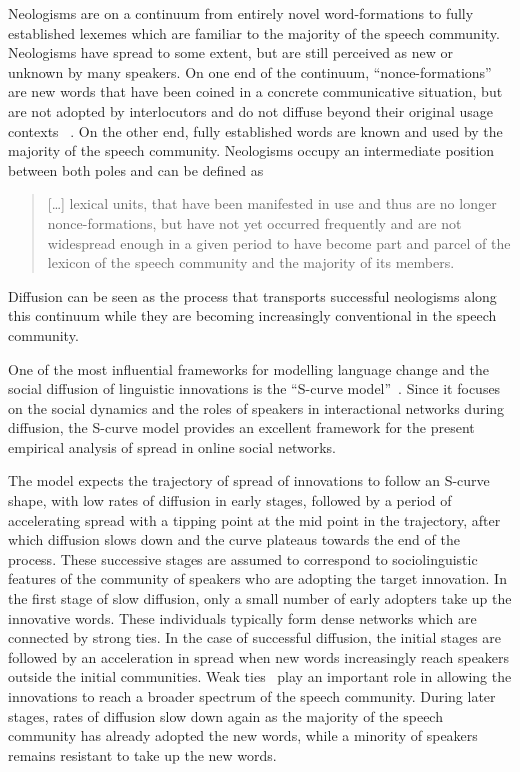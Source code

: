 \documentclass[
  a4paper,
  abstract=on,
  captions=tableabove
  ]{scrartcl}
\begin{document}
    Neologisms are on a continuum from entirely novel word-formations to fully established lexemes which are familiar to the majority of the speech community. Neologisms have spread to some extent, but are still perceived as new or unknown by many speakers. On one end of the continuum, \enquote{nonce-formations} are new words that have been coined in a concrete communicative situation, but are not adopted by interlocutors and do not diffuse beyond their original usage contexts~ \parencite{Hohenhaus1996AdhocWortbildungTerminologie}. On the other end, fully established words are known and used by the majority of the speech community. Neologisms occupy an intermediate position between both poles and can be defined as

    \blockquote[{\cite[31]{Kerremans2015WebNew}}]{
      [\dots] lexical units, that have been manifested in use and thus are no longer nonce-formations, but have not yet occurred frequently and are not widespread enough in a given period to have become part and parcel of the lexicon of the speech community and the majority of its members.
      }

    Diffusion can be seen as the process that transports successful neologisms along this continuum while they are becoming increasingly conventional in the speech community.
  
    One of the most influential frameworks for modelling language change and the social diffusion of linguistic innovations is the \enquote{S-curve model}~\parencite{Milroy1992LinguisticVariation, Nevalainen2015DescriptiveAdequacy, Labov2007TransmissionDiffusion}. Since it focuses on the social dynamics and the roles of speakers in interactional networks during diffusion, the S-curve model provides an excellent framework for the present empirical analysis of spread in online social networks.

      The model expects the trajectory of spread of innovations to follow an S-curve shape, with low rates of diffusion in early stages, followed by a period of accelerating spread with a tipping point at the mid point in the trajectory, after which diffusion slows down and the curve plateaus towards the end of the process. These successive stages are assumed to correspond to sociolinguistic features of the community of speakers who are adopting the target innovation. In the first stage of slow diffusion, only a small number of early adopters take up the innovative words. These individuals typically form dense networks which are connected by strong ties. In the case of successful diffusion, the initial stages are followed by an acceleration in spread when new words increasingly reach speakers outside the initial communities. Weak ties~\parencite{Granovetter1977StrengthWeak} play an important role in allowing the innovations to reach a broader spectrum of the speech community. During later stages, rates of diffusion slow down again as the majority of the speech community has already adopted the new words, while a minority of speakers remains resistant to take up the new words.
\end{document}
